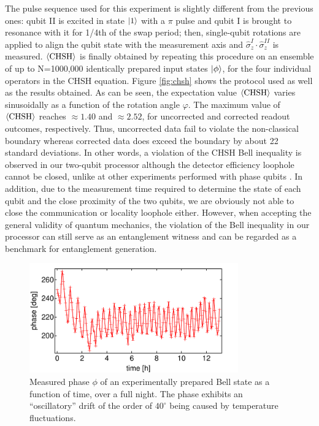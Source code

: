 The pulse sequence used for this experiment is slightly different from the previous ones: qubit II is excited in state $\left| 1 \right>$ with a $\pi$ pulse and qubit I is brought to resonance with it for 1/4th of the swap period; then, single-qubit rotations are applied to align the qubit state with the measurement axis and $\hat{\sigma}_z^I\cdot \hat{\sigma}_z^{II}$ is measured. $\left< \mathrm{CHSH} \right>$  is finally obtained by repeating this procedure on an ensemble of up to N=1000,000 identically prepared input states $\left| \phi \right>$, for the four individual operators in the CHSH equation. Figure \ref{fig:chsh} shows the protocol used as well as the results obtained. As can be seen, the expectation value $\left< \mathrm{CHSH} \right>$ varies sinusoidally as a function of the rotation angle $\varphi$. The maximum value of $\left< \mathrm{CHSH} \right>$ reaches $\approx 1.40$ and $\approx 2.52$, for uncorrected and corrected readout outcomes, respectively. Thus, uncorrected data fail to violate the non-classical boundary whereas corrected data does exceed the boundary by about 22 standard deviations. In other words, a violation of the CHSH Bell inequality is observed in our two-qubit processor although the detector efficiency loophole cannot be closed, unlike at other experiments performed with phase qubits \citep{ansmann_violation_2009}. In addition, due to the measurement time required to determine the state of each qubit and the close proximity of the two qubits, we are obviously not able to close the communication or locality loophole either. However, when accepting the general validity of quantum mechanics, the  violation of the Bell inequality in  our processor can still serve as an entanglement witness and can be regarded as a benchmark for entanglement generation.

\begin{figure}
	\centering
	\includegraphics[width=9cm]{"./data/ct5/2011_03_17 - chsh/chsh_drift"}
	\caption[]{Measured phase $\phi$ of an experimentally prepared Bell state as a function of time, over a full night. The phase exhibits an ``oscillatory'' drift of the order of $40^\circ$ being caused by temperature fluctuations.}
	\label{fig:chsh_drift}
\end{figure}

